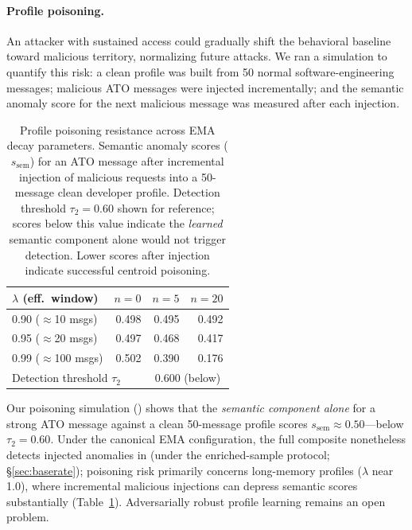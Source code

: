 \documentclass[conference]{IEEEtran}
\newcommand{\seman}{s_{\mathrm{sem}}}
\begin{document}
\paragraph{Profile poisoning.}
An attacker with sustained access could gradually shift the behavioral baseline toward
malicious territory, normalizing future attacks.
We ran a simulation to quantify this risk: a clean profile was built from 50 normal
software-engineering messages; malicious ATO messages were injected incrementally;
and the semantic anomaly score for the next malicious message was measured after each
injection.

\begin{table}[h]
\centering
\caption{Profile poisoning resistance across EMA decay parameters.
  Semantic anomaly scores ($\seman$) for an ATO message after incremental injection
  of malicious requests into a 50-message clean developer profile.
  Detection threshold $\tau_2 = 0.60$ shown for reference; scores below this value
  indicate the \emph{learned} semantic component alone would not trigger detection.
  Lower scores after injection indicate successful centroid poisoning.}
\label{tab:poisoning}
\small
\begin{tabular}{lrrr}
\toprule
$\lambda$ (eff.\ window) & $n{=}0$ & $n{=}5$ & $n{=}20$ \\
\midrule
0.90 ($\approx$10 msgs)  & 0.498 & 0.495 & 0.492 \\
0.95 ($\approx$20 msgs)  & 0.497 & 0.468 & 0.417 \\
0.99 ($\approx$100 msgs) & 0.502 & 0.390 & 0.176 \\
\midrule
\multicolumn{2}{l}{Detection threshold $\tau_2$} & \multicolumn{2}{c}{0.600 (below)} \\
\bottomrule
\end{tabular}
\end{table}

Our poisoning simulation () shows that the \emph{semantic component
alone} for a strong ATO message against a clean 50-message profile scores
$\seman \approx 0.50$---below $\tau_2{=}0.60$.
Under the canonical EMA configuration, the full composite nonetheless detects injected
anomalies in  (under the enriched-sample protocol;
\S\ref{sec:baserate}); poisoning risk primarily concerns long-memory profiles
($\lambda$ near 1.0), where incremental malicious injections can depress semantic scores
substantially (Table~\ref{tab:poisoning}).
Adversarially robust profile learning remains an open problem.
\end{document}
